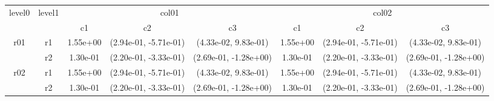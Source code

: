 \begin{tabular}{cccccccc}
\toprule
\multirow{2}{*}{level0} & \multirow{2}{*}{level1}&\multicolumn{3}{c}{col01}&\multicolumn{3}{c}{col02}\tabularnewline
\cmidrule(lr){3-5}
\cmidrule(lr){6-8}
&&c1&c2&c3&c1&c2&c3\tabularnewline
\midrule
\midrule
\multirow{2}{*}{r01}&r1&1.55e+00& (2.94e-01, -5.71e-01)& (4.33e-02, 9.83e-01)&1.55e+00& (2.94e-01, -5.71e-01)& (4.33e-02, 9.83e-01)\tabularnewline
&r2&1.30e-01& (2.20e-01, -3.33e-01)& (2.69e-01, -1.28e+00)&1.30e-01& (2.20e-01, -3.33e-01)& (2.69e-01, -1.28e+00)\tabularnewline
\midrule
\multirow{2}{*}{r02}&r1&1.55e+00& (2.94e-01, -5.71e-01)& (4.33e-02, 9.83e-01)&1.55e+00& (2.94e-01, -5.71e-01)& (4.33e-02, 9.83e-01)\tabularnewline
&r2&1.30e-01& (2.20e-01, -3.33e-01)& (2.69e-01, -1.28e+00)&1.30e-01& (2.20e-01, -3.33e-01)& (2.69e-01, -1.28e+00)\tabularnewline
\bottomrule
\end{tabular}

